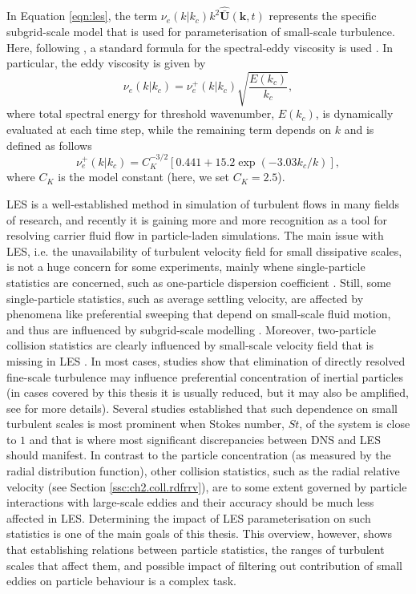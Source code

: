 \documentclass{pracamgren}
\begin{document}
In Equation \ref{eqn:les}, the term $\nu_{e}(k|k_{c})k^{2} \mathbf{\hat{\bar{U}}}(\mathbf{k}, t)$ represents the specific subgrid-scale model that is used for parameterisation of small-scale turbulence.
Here, following \textcite{Rosa2017}, a standard formula for the spectral-eddy viscosity is used \parencite[see][]{Chollet1981}.
In particular, the eddy viscosity is given by
\begin{equation}
\nu_{e}(k|k_{c}) = \nu_{e}^{+}(k|k_{c}) \sqrt{\frac{E(k_{c})}{k_c}} ,
\label{eqn:sgs-1}
\end{equation}
where total spectral energy for threshold wavenumber, $E(k_c)$, is dynamically evaluated at each time step, while the remaining term depends on $k$ and is defined as follows
\begin{equation}
\nu_{e}^{+}(k|k_{c}) = C_{K}^{-3/2} [ 0.441 + 15.2 \exp( -3.03 k_{c} / k) ] ,
\label{eqn:sgs-2}
\end{equation}
where $C_{K}$ is the model constant (here, we set $C_{K} = 2.5$).

\medskip

LES is a well-established method in simulation of turbulent flows in many fields of research, and recently it is gaining more and more recognition as a tool for resolving carrier fluid flow in particle-laden simulations.
The main issue with LES, i.e. the unavailability of turbulent velocity field for small dissipative scales, is not a huge concern for some experiments, mainly whene single-particle statistics are concerned, such as one-particle dispersion coefficient \parencite{Yang2008}.
Still, some single-particle statistics, such as average settling velocity, are affected by phenomena like preferential sweeping that depend on small-scale fluid motion, and thus are influenced by subgrid-scale modelling \parencite{Rosa2017,Tom2019}.
Moreover, two-particle collision statistics are clearly influenced by small-scale velocity field that is missing in LES \parencite{Jin2010}.
In most cases, studies show that elimination of directly resolved fine-scale turbulence may influence preferential concentration of inertial particles (in cases covered by this thesis it is usually reduced, but it may also be amplified, see \textcite{Fede2006} for more details).
Several studies established that such dependence on small turbulent scales is most prominent when Stokes number, $St$, of the system is close to $1$ \parencite{Wang2000,Pozorski2009,Jin2010} and that is where most significant discrepancies between DNS and LES should manifest.
In contrast to the particle concentration (as measured by the radial distribution function), other collision statistics, such as the radial relative velocity (see Section \ref{ssc:ch2.coll.rdfrrv}), are to some extent governed by particle interactions with large-scale eddies \parencite{Wang2000} and their accuracy should be much less affected in LES. 
Determining the impact of LES parameterisation on such statistics is one of the main goals of this thesis.
This overview, however, shows that establishing relations between particle statistics, the ranges of turbulent scales that affect them, and possible impact of filtering out contribution of small eddies on particle behaviour is a complex task.
\end{document}
